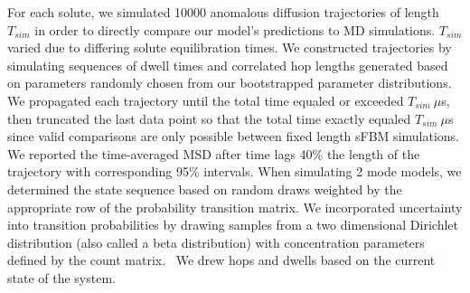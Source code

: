 \documentclass{article}
\begin{document}
  For each solute, we simulated 10000 anomalous diffusion trajectories of length
  $T_{sim}$ in order to directly compare our model's predictions to MD simulations.
  $T_{sim}$ varied due to differing solute equilibration times. We constructed 
  trajectories by simulating sequences of dwell times and correlated hop lengths
  generated based on parameters randomly chosen from our bootstrapped parameter 
  distributions. We propagated each trajectory until the total time equaled or 
  exceeded $T_{sim}~ \mu$s, then truncated the last data point so that the total 
  time exactly equaled $T_{sim}~ \mu$s since valid comparisons are only possible 
  between fixed length sFBM simulations. 
  We reported the time-averaged MSD after time lags 40\% the length of the trajectory
  with corresponding 95\% intervals.
  When simulating 2 mode models, we determined the state sequence based on random 
  draws weighted by the appropriate row of the probability transition matrix. We 
  incorporated uncertainty into transition probabilities by drawing samples from a 
  two dimensional Dirichlet distribution (also called a beta distribution) with concentration parameters defined by 
  the count matrix.~\cite{bacallado_bayesian_2009} We drew hops and dwells based on
  the current state of the system. 

  
\end{document}
